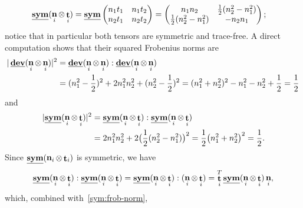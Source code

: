 \documentclass[a4paper,twoside,10pt]{article}
\theoremstyle{plain}
\theoremstyle{remark}
\theoremstyle{definition}
\numberwithin{equation}{section}
\numberwithin{figure}{section}
\DeclareMathOperator{\dev}{\underline{\mathbf{dev}}}
\newcommand{\sym}{\underline{\bf{sym}}}
\DeclareMathOperator{\norm}{\bf{n}}
\DeclareMathOperator{\tang}{\bf{t}}
\newcommand{\ncompo}{n_1}
\newcommand{\ncompt}{n_2}
\newcommand{\tcompo}{t_1}
\newcommand{\tcompt}{t_2}
\newcommand{\normi}{\norm_i}
\newcommand{\tangi}{\tang_i}
\begin{document}
\begin{equation*}
\begin{split}
\sym(\normi\otimes\tangi)
&= \sym
\begin{pmatrix}
    \ncompo\tcompo  & \ncompo\tcompt   \\
    \ncompt\tcompo  & \ncompt\tcompt   
\end{pmatrix} 
= \begin{pmatrix}
    \ncompo\ncompt  & \frac12 (\ncompt^2 -\ncompo^2)   \\
    \frac12 ( \ncompt^2 - \ncompo^2)  & -\ncompt\ncompo
\end{pmatrix};
\end{split}
\end{equation*}
notice that in particular both tensors are symmetric and trace-free.
A direct computation shows that
their squared Frobenius norms
are
\begin{equation} \label{dev:frob-norm}
\begin{split}
|\dev(\normi\otimes\normi)|^2
&= \dev(\normi\otimes\normi):\dev(\normi\otimes\normi) \\
&=  (\ncompo^2 - \frac12)^2 + 2\ncompo^2\ncompt^2 + (\ncompt^2 - \frac12)^2
=  (\ncompo^2 + \ncompt^2)^2 - \ncompo^2 - \ncompt^2 + \frac12 = \frac12 
\end{split}
\end{equation}
and
\begin{equation} \label{sym:frob-norm}
\begin{split}
|\sym(\normi\otimes\tangi)|^2
&=\sym(\normi\otimes\tangi):\sym(\normi\otimes\tangi) \\
&=  2\ncompo^2\ncompt^2 + 2 \big(\frac12 (\ncompt^2 -\ncompo^2)\big)^2   
=  \frac12\big(\ncompo^2 + \ncompt^2\big)^2 = \frac12.
\end{split}
\end{equation}
Since $\sym(\normi\otimes\tangi)$ is symmetric,
we have
\begin{equation*}
\sym(\normi\otimes\tangi):\sym(\normi\otimes\tangi)
=\sym(\normi\otimes\tangi) : (\normi\otimes\tangi)
= \tangi^T \sym(\normi\otimes\tangi) \normi,
\end{equation*}
which,
combined with~\eqref{sym:frob-norm},
\end{document}
